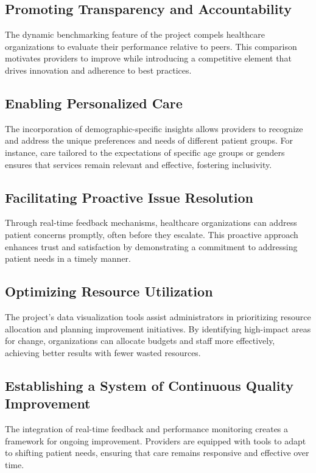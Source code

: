 \subsection{Promoting Transparency and Accountability}
The dynamic benchmarking feature of the project compels healthcare organizations to evaluate their performance relative to peers. This comparison motivates providers to improve while introducing a competitive element that drives innovation and adherence to best practices.

\subsection{Enabling Personalized Care}
The incorporation of demographic-specific insights allows providers to recognize and address the unique preferences and needs of different patient groups. For instance, care tailored to the expectations of specific age groups or genders ensures that services remain relevant and effective, fostering inclusivity.

\subsection{Facilitating Proactive Issue Resolution}
Through real-time feedback mechanisms, healthcare organizations can address patient concerns promptly, often before they escalate. This proactive approach enhances trust and satisfaction by demonstrating a commitment to addressing patient needs in a timely manner.

\subsection{Optimizing Resource Utilization}
The project’s data visualization tools assist administrators in prioritizing resource allocation and planning improvement initiatives. By identifying high-impact areas for change, organizations can allocate budgets and staff more effectively, achieving better results with fewer wasted resources.

\subsection{Establishing a System of Continuous Quality Improvement}
The integration of real-time feedback and performance monitoring creates a framework for ongoing improvement. Providers are equipped with tools to adapt to shifting patient needs, ensuring that care remains responsive and effective over time.

